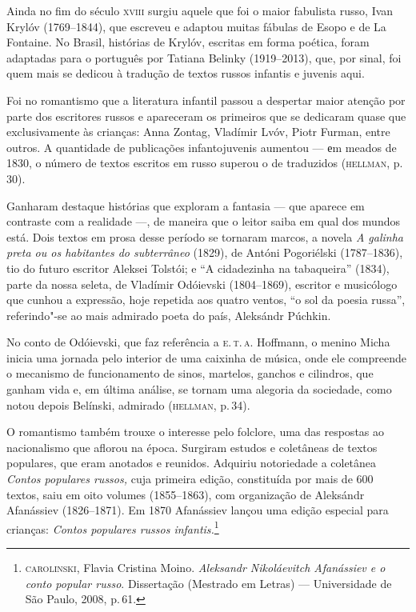 Ainda no fim do século \textsc{xviii} surgiu aquele que foi o maior fabulista
russo, Ivan Krylóv (1769--1844), que escreveu e adaptou muitas fábulas
de Esopo e de La Fontaine. No Brasil, histórias de Krylóv, escritas em
forma poética, foram adaptadas para o português por Tatiana Belinky
(1919--2013), que, por sinal, foi quem mais se dedicou à tradução de
textos russos infantis e juvenis aqui.

Foi no romantismo que a literatura infantil passou a despertar maior
atenção por parte dos escritores russos e apareceram os primeiros que se
dedicaram quase que exclusivamente às crianças: Anna Zontag, Vladímir
Lvóv, Piotr Furman, entre outros. A quantidade de publicações infantojuvenis aumentou
--- еm meados de 1830, o número de textos escritos em russo superou o de
traduzidos (\textsc{hellman}, p.\,30).

Ganharam destaque histórias que exploram a fantasia --- que aparece em
contraste com a realidade ---, de maneira que o leitor saiba em qual dos mundos está. Dois textos em prosa desse período se tornaram marcos,
a novela \emph{A galinha preta ou os habitantes do subterrâneo} (1829),
de Antóni Pogoriélski (1787--1836), tio do futuro escritor Aleksei
Tolstói; e ``A cidadezinha na tabaqueira'' (1834), parte
da nossa seleta, de Vladímir Odóievski (1804--1869), escritor e
musicólogo que cunhou a expressão, hoje repetida aos quatro ventos, ``o
sol da poesia russa'', referindo"-se ao mais admirado poeta do país,
Aleksándr Púchkin.

No conto de Odóievski, que faz referência a \textsc{e.\,t.\,a.} Hoffmann, o menino
Micha inicia uma jornada pelo interior de uma caixinha de música, onde
ele compreende o mecanismo de funcionamento de sinos, martelos, ganchos
e cilindros, que ganham vida e, em última análise, se tornam uma
alegoria da sociedade, como notou depois Belínski, admirado (\textsc{hellman}, p.\,34).

O romantismo também trouxe o interesse pelo folclore, uma das respostas
ao nacionalismo que aflorou na época. Surgiram estudos e coletâneas de
textos populares, que eram anotados e reunidos. Adquiriu notoriedade a
coletânea \emph{Contos populares russos,} cuja primeira edição, constituída por mais
de 600 textos, saiu em oito volumes (1855--1863), com organização de
Aleksándr Afanássiev (1826--1871). Em 1870 Afanássiev lançou uma edição
especial para crianças: \emph{Contos populares russos
infantis.}\footnote{\textsc{carolinski}, Flavia Cristina Moino. \emph{Aleksandr
  Nikoláevitch Afanássiev e o conto popular russo}. Dissertação
  (Mestrado em Letras) --- Universidade de São Paulo, 2008, p.\,61.}

